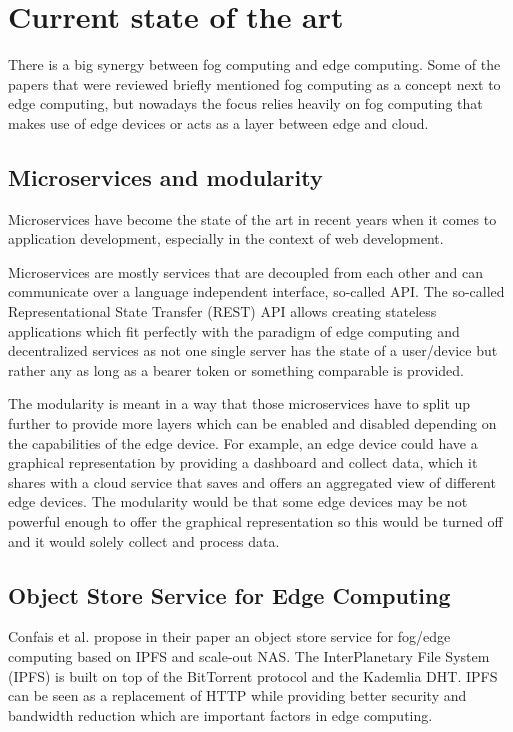 \section{Current state of the art}\label{sec:evaluation} 


There is a big synergy between fog computing and edge computing. Some of the papers that were reviewed briefly mentioned fog computing as a concept next to edge computing, but nowadays the focus relies heavily on fog computing that makes use of edge devices or acts as a layer between edge and cloud.

\subsection{Microservices and modularity}
Microservices have become the state of the art in recent years when it comes to application development, especially in the context of web development.

Microservices are mostly services that are decoupled from each other and can communicate over a language independent interface, so-called API. The so-called Representational State Transfer (REST) API allows creating stateless applications which fit perfectly with the paradigm of edge computing and decentralized services as not one single server has the state of a user/device but rather any as long as a bearer token or something comparable is provided.

The modularity is meant in a way that those microservices have to split up further to provide more layers which can be enabled and disabled depending on the capabilities of the edge device. For example, an edge device could have a graphical representation by providing a dashboard and collect data, which it shares with a cloud service that saves and offers an aggregated view of different edge devices. The modularity would be that some edge devices may be not powerful enough to offer the graphical representation so this would be turned off and it would solely collect and process data.

\subsection{Object Store Service for Edge Computing}
Confais et al. propose in their paper \cite{8014358} an object store service for fog/edge computing based on IPFS and scale-out NAS.
The InterPlanetary File System (IPFS) is built on top of the BitTorrent protocol and the Kademlia DHT. IPFS can be seen as a replacement of HTTP while providing better security and bandwidth reduction which are important factors in edge computing.


